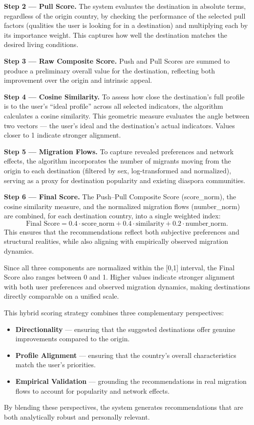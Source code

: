 \documentclass[11pt]{article}
\begin{document}
\medskip
\noindent
\textbf{Step 2 — Pull Score.} The system evaluates the destination in absolute terms, regardless of the origin country, by checking the performance of the selected pull factors (qualities the user is looking for in a destination) and multiplying each by its importance weight. This captures how well the destination matches the desired living conditions.

\medskip
\noindent
\textbf{Step 3 — Raw Composite Score.} Push and Pull Scores are summed to produce a preliminary overall value for the destination, reflecting both improvement over the origin and intrinsic appeal.

\medskip
\noindent
\textbf{Step 4 — Cosine Similarity.} To assess how close the destination’s full profile is to the user’s ``ideal profile'' across all selected indicators, the algorithm calculates a cosine similarity. This geometric measure evaluates the angle between two vectors --- the user’s ideal and the destination’s actual indicators. Values closer to 1 indicate stronger alignment.

\medskip
\noindent
\textbf{Step 5 — Migration Flows.} To capture revealed preferences and network effects, the algorithm incorporates the number of migrants moving from the origin to each destination (filtered by sex, log-transformed and normalized), serving as a proxy for destination popularity and existing diaspora communities.

\medskip
\noindent
\textbf{Step 6 — Final Score.} The Push--Pull Composite Score (score\_norm), the cosine similarity measure, and the normalized migration flows (number\_norm) are combined, for each destination country, into a single weighted index:
\[
\text{Final Score} = 0.4 \cdot \text{score\_norm} + 0.4 \cdot \text{similarity} + 0.2 \cdot \text{number\_norm}.
\]
This ensures that the recommendations reflect both subjective preferences and structural realities, while also aligning with empirically observed migration dynamics.

\noindent
Since all three components are normalized within the
[0,1] interval, the Final Score also ranges between 0 and 1. Higher values indicate stronger alignment with both user preferences and observed migration dynamics, making destinations directly comparable on a unified scale.

\medskip
\noindent
This hybrid scoring strategy combines three complementary perspectives:
\begin{itemize}
    \item \textbf{Directionality} — ensuring that the suggested destinations offer genuine improvements compared to the origin.
    \item \textbf{Profile Alignment} — ensuring that the country’s overall characteristics match the user’s priorities.
    \item \textbf{Empirical Validation} — grounding the recommendations in real migration flows to account for popularity and network effects.
\end{itemize}
By blending these perspectives, the system generates recommendations that are both analytically robust and personally relevant.
\end{document}
